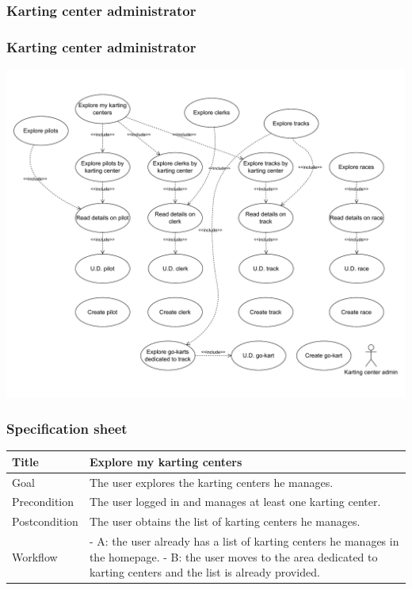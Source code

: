 \documentclass{beamer}
\begin{document}
\subsubsection*{Karting center administrator}

\begin{frame}
    \frametitle{Karting center administrator}
    \centering
    \includegraphics[width=0.7\linewidth]{drawio/karting-center-admin.pdf}
\end{frame}

\begin{frame}
    \frametitle{Specification sheet}
    \begin{table}
        \tiny
        \begin{tabular}{|p{2cm}|p{6cm}|}
        \hline  
        Title & \textbf{Explore my karting centers} \\
        \hline
        Goal & The user explores the karting centers he manages. \\
        \hline
        Precondition & The user logged in and manages at least one karting center.\\
        \hline
        Postcondition & The user obtains the list of karting centers he manages. \\
        \hline
        Workflow &
        - A: the user already has a list of karting centers he manages in the homepage. \newline
        - B: the user moves to the area dedicated to karting centers and the list is already provided. \\
        \hline
        \end{tabular}
\end{table}
\end{frame}
\end{document}
